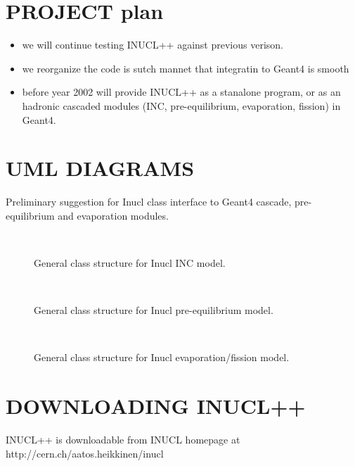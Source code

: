 \begin{appendix}

\section{PROJECT plan}
\begin{itemize}
\item we will continue testing INUCL++ against previous verison.
\item we reorganize the code is sutch mannet that integratin to Geant4
  is smooth
\item before year 2002 will provide INUCL++ as a stanalone program, 
or as an hadronic cascaded modules 
(INC, pre-equilibrium, evaporation, fission) in Geant4. 
\end{itemize}

\section{UML DIAGRAMS}
Preliminary suggestion for Inucl class interface to Geant4 cascade, pre-equilibrium
and evaporation modules.

\begin{figure}
  \begin{center}
    \leavevmode
    \mbox{\epsfxsize=8cm  }
       \caption{General class structure for Inucl INC model.}
  \label{massPb}
  \end{center}
\end{figure}

\begin{figure}
  \begin{center}
    \leavevmode
    \mbox{\epsfxsize=8cm  }
       \caption{General class structure for Inucl pre-equilibrium model.}
  \label{massPb}
  \end{center}
\end{figure}

\begin{figure}
  \begin{center}
    \leavevmode
    \mbox{\epsfxsize=8cm   }
       \caption{General class structure for Inucl evaporation/fission model.}
  \label{massPb}
  \end{center}
\end{figure}

\section{DOWNLOADING INUCL++}
INUCL++ is downloadable from INUCL homepage at
http://cern.ch/aatos.heikkinen/inucl


\end{appendix}
